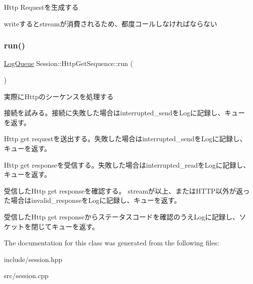 Http Requestを生成する 

writeするとstreamが消費されるため、都度コールしなければならない \mbox{\label{class_session_1_1_http_get_sequence_a1a90982bc3eaf7332de708f9e7a5e260}} 
\subsubsection{\texorpdfstring{run()}{run()}}
{\footnotesize\ttfamily \mbox{\hyperlink{class_log_queue}{Log\+Queue}} Session\+::\+Http\+Get\+Sequence\+::run (\begin{DoxyParamCaption}{ }\end{DoxyParamCaption})}



実際に\+Httpのシーケンスを処理する 

接続を試みる。接続に失敗した場合はinterrupted\+\_\+sendを\+Logに記録し、キューを返す。

Http get requestを送出する。失敗した場合はinterrupted\+\_\+sendを\+Logに記録し、キューを返す。

Http get responseを受信する。失敗した場合はinterrupted\+\_\+readを\+Logに記録し、キューを返す。

受信した\+Http get responseを確認する。 streamが以上、または\+H\+T\+T\+P以外が返った場合はinvalid\+\_\+responseを\+Logに記録し、キューを返す。

受信した\+Http get responseからステータスコードを確認のうえ\+Logに記録し、ソケットを閉じてキューを返す。 

The documentation for this class was generated from the following files\+:\begin{DoxyCompactItemize}
\item 
include/session.\+hpp\item 
src/session.\+cpp\end{DoxyCompactItemize}
